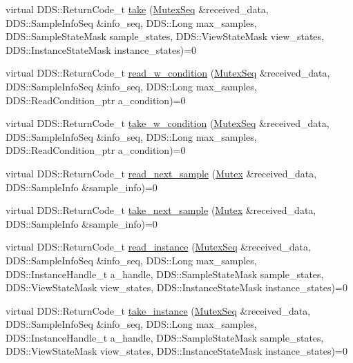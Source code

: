 \begin{DoxyCompactItemize}
virtual DDS::ReturnCode\_\-t \hyperlink{classKnowledge_1_1MutexDataReader_a9deff0455f4676c19067cde4b7962dd2}{take} (\hyperlink{namespaceKnowledge_a3165529aa87299c6a92754fbd7eeeff4}{MutexSeq} \&received\_\-data, DDS::SampleInfoSeq \&info\_\-seq, DDS::Long max\_\-samples, DDS::SampleStateMask sample\_\-states, DDS::ViewStateMask view\_\-states, DDS::InstanceStateMask instance\_\-states)=0
\item 
virtual DDS::ReturnCode\_\-t \hyperlink{classKnowledge_1_1MutexDataReader_a5f439299bf5fb0ee0472aaafb3753f72}{read\_\-w\_\-condition} (\hyperlink{namespaceKnowledge_a3165529aa87299c6a92754fbd7eeeff4}{MutexSeq} \&received\_\-data, DDS::SampleInfoSeq \&info\_\-seq, DDS::Long max\_\-samples, DDS::ReadCondition\_\-ptr a\_\-condition)=0
\item 
virtual DDS::ReturnCode\_\-t \hyperlink{classKnowledge_1_1MutexDataReader_a22ca79ab8a83d7506174b376addac467}{take\_\-w\_\-condition} (\hyperlink{namespaceKnowledge_a3165529aa87299c6a92754fbd7eeeff4}{MutexSeq} \&received\_\-data, DDS::SampleInfoSeq \&info\_\-seq, DDS::Long max\_\-samples, DDS::ReadCondition\_\-ptr a\_\-condition)=0
\item 
virtual DDS::ReturnCode\_\-t \hyperlink{classKnowledge_1_1MutexDataReader_ad5dc3a857e5cc711b00eb68004af84ac}{read\_\-next\_\-sample} (\hyperlink{structKnowledge_1_1Mutex}{Mutex} \&received\_\-data, DDS::SampleInfo \&sample\_\-info)=0
\item 
virtual DDS::ReturnCode\_\-t \hyperlink{classKnowledge_1_1MutexDataReader_a18493f33aea07e10cc53f41a6579a220}{take\_\-next\_\-sample} (\hyperlink{structKnowledge_1_1Mutex}{Mutex} \&received\_\-data, DDS::SampleInfo \&sample\_\-info)=0
\item 
virtual DDS::ReturnCode\_\-t \hyperlink{classKnowledge_1_1MutexDataReader_a74b0065deb746be5fd00b8fc2770d316}{read\_\-instance} (\hyperlink{namespaceKnowledge_a3165529aa87299c6a92754fbd7eeeff4}{MutexSeq} \&received\_\-data, DDS::SampleInfoSeq \&info\_\-seq, DDS::Long max\_\-samples, DDS::InstanceHandle\_\-t a\_\-handle, DDS::SampleStateMask sample\_\-states, DDS::ViewStateMask view\_\-states, DDS::InstanceStateMask instance\_\-states)=0
\item 
virtual DDS::ReturnCode\_\-t \hyperlink{classKnowledge_1_1MutexDataReader_a01b83885cc067cadc8d9a85f34990159}{take\_\-instance} (\hyperlink{namespaceKnowledge_a3165529aa87299c6a92754fbd7eeeff4}{MutexSeq} \&received\_\-data, DDS::SampleInfoSeq \&info\_\-seq, DDS::Long max\_\-samples, DDS::InstanceHandle\_\-t a\_\-handle, DDS::SampleStateMask sample\_\-states, DDS::ViewStateMask view\_\-states, DDS::InstanceStateMask instance\_\-states)=0

\end{DoxyCompactItemize}
